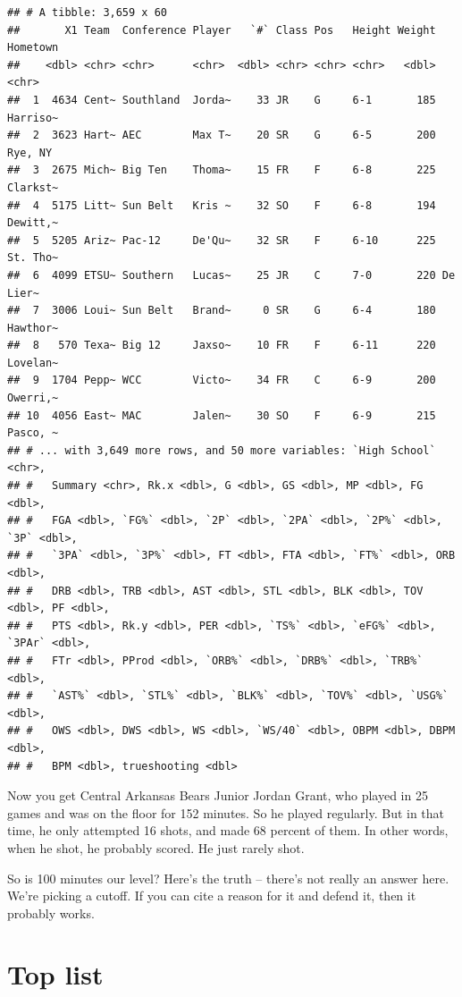 \documentclass[
]{book}
\begin{document}
\begin{verbatim}
## # A tibble: 3,659 x 60
##       X1 Team  Conference Player   `#` Class Pos   Height Weight Hometown
##    <dbl> <chr> <chr>      <chr>  <dbl> <chr> <chr> <chr>   <dbl> <chr>   
##  1  4634 Cent~ Southland  Jorda~    33 JR    G     6-1       185 Harriso~
##  2  3623 Hart~ AEC        Max T~    20 SR    G     6-5       200 Rye, NY 
##  3  2675 Mich~ Big Ten    Thoma~    15 FR    F     6-8       225 Clarkst~
##  4  5175 Litt~ Sun Belt   Kris ~    32 SO    F     6-8       194 Dewitt,~
##  5  5205 Ariz~ Pac-12     De'Qu~    32 SR    F     6-10      225 St. Tho~
##  6  4099 ETSU~ Southern   Lucas~    25 JR    C     7-0       220 De Lier~
##  7  3006 Loui~ Sun Belt   Brand~     0 SR    G     6-4       180 Hawthor~
##  8   570 Texa~ Big 12     Jaxso~    10 FR    F     6-11      220 Lovelan~
##  9  1704 Pepp~ WCC        Victo~    34 FR    C     6-9       200 Owerri,~
## 10  4056 East~ MAC        Jalen~    30 SO    F     6-9       215 Pasco, ~
## # ... with 3,649 more rows, and 50 more variables: `High School` <chr>,
## #   Summary <chr>, Rk.x <dbl>, G <dbl>, GS <dbl>, MP <dbl>, FG <dbl>,
## #   FGA <dbl>, `FG%` <dbl>, `2P` <dbl>, `2PA` <dbl>, `2P%` <dbl>, `3P` <dbl>,
## #   `3PA` <dbl>, `3P%` <dbl>, FT <dbl>, FTA <dbl>, `FT%` <dbl>, ORB <dbl>,
## #   DRB <dbl>, TRB <dbl>, AST <dbl>, STL <dbl>, BLK <dbl>, TOV <dbl>, PF <dbl>,
## #   PTS <dbl>, Rk.y <dbl>, PER <dbl>, `TS%` <dbl>, `eFG%` <dbl>, `3PAr` <dbl>,
## #   FTr <dbl>, PProd <dbl>, `ORB%` <dbl>, `DRB%` <dbl>, `TRB%` <dbl>,
## #   `AST%` <dbl>, `STL%` <dbl>, `BLK%` <dbl>, `TOV%` <dbl>, `USG%` <dbl>,
## #   OWS <dbl>, DWS <dbl>, WS <dbl>, `WS/40` <dbl>, OBPM <dbl>, DBPM <dbl>,
## #   BPM <dbl>, trueshooting <dbl>
\end{verbatim}

Now you get Central Arkansas Bears Junior Jordan Grant, who played in 25 games and was on the floor for 152 minutes. So he played regularly. But in that time, he only attempted 16 shots, and made 68 percent of them. In other words, when he shot, he probably scored. He just rarely shot.

So is 100 minutes our level? Here's the truth -- there's not really an answer here. We're picking a cutoff. If you can cite a reason for it and defend it, then it probably works.

\hypertarget{top-list}{%
\section{Top list}\label{top-list}}
\end{document}
